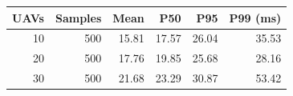 \begin{tabular}{rrrrrr}
\toprule
UAVs & Samples & Mean & P50 & P95 & P99 (ms) \\
\midrule
10 & 500 & 15.81 & 17.57 & 26.04 & 35.53 \\
20 & 500 & 17.76 & 19.85 & 25.68 & 28.16 \\
30 & 500 & 21.68 & 23.29 & 30.87 & 53.42 \\
\bottomrule
\end{tabular}
